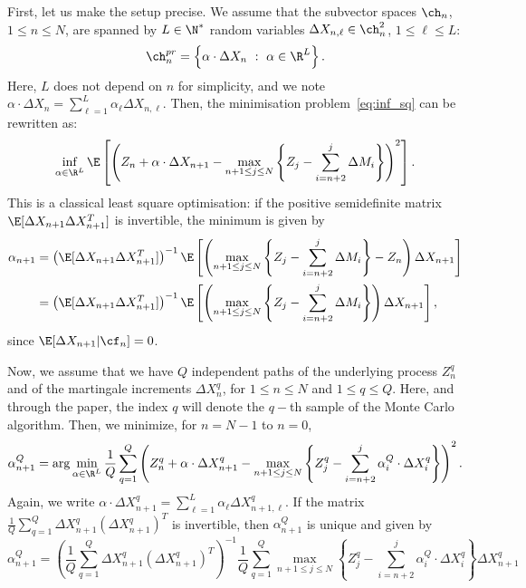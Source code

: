 First, let us make the setup precise. We assume that the subvector spaces $\ch_n$, $1\le n \le N$, are spanned by $L \in \N^*$ random variables $\Delta X_{n,\ell} \in \ch^2_n$, $1\le \ell \le L$:
$$\ch^{pr}_n=\left\{ \alpha \cdot \Delta X_{n} \ : \ \alpha \in \R^L \right\}.$$
Here, $L$ does not depend on $n$ for simplicity, and we note $\alpha \cdot \Delta X_{n}= \sum_{\ell=1}^L \alpha_\ell \Delta X_{n,\ell}$. Then, the minimisation problem~\eqref{eq:inf_sq}  can be rewritten as:
\begin{equation}\label{eq:inf_sq2}
  \inf_{\alpha \in \R^L }\E\left[ \left(Z_{n} + \alpha \cdot \Delta X_{n+1}  - \max_{n + 1\le j \le N} \left\{Z_{j} - \sum_{i=n+2}^{j} \Delta M_i\right\}\right)^2\right].
\end{equation} 
This is a classical least square optimisation: if the positive semidefinite matrix $\E[\Delta X_{n+1}\Delta X_{n+1}^T]$ is invertible, the minimum is given by
\begin{align}
   \alpha_{n+1} &= \left( \E[\Delta X_{n+1}\Delta X_{n+1}^T] \right)^{-1} \E\left[ \left( \max_{n + 1\le j \le N} \left\{Z_{j} - \sum_{i=n+2}^{j} \Delta M_i\right\} -Z_n \right) \Delta X_{n+1}\right] \notag\\
   &= \left( \E[\Delta X_{n+1}\Delta X_{n+1}^T] \right)^{-1} \E\left[ \left( \max_{n + 1\le j \le N} \left\{Z_{j} - \sum_{i=n+2}^{j} \Delta M_i\right\} \right) \Delta X_{n+1}\right], \label{def_alpha_n}
\end{align}
since $\E[\Delta X_{n+1}|\cf_n]=0$. 

Now, we assume that we have $Q$ independent paths of the underlying process $Z_n^q$ and of the martingale increments $\Delta X^q_n$, for $1\le n \le N$ and $1\le q\le Q$. Here, and through the paper, the index $q$ will denote the $q-$th sample of the Monte Carlo algorithm.  Then, we minimize, for $n=N-1$ to $n=0$, 
\begin{equation*}
\alpha^Q_{n+1}= \arg \min_{\alpha \in \R^L} \frac 1Q \sum_{q=1}^Q \left(Z^q_{n} + \alpha \cdot \Delta X^q_{n+1}  - \max_{n + 1\le j \le N} \left\{ Z^q_{j} - \sum_{i=n+2}^{j} \alpha^Q_i \cdot \Delta X^q_i \right\}\right)^2 .
\end{equation*}
Again, we write $\alpha \cdot \Delta X^q_{n+1}=\sum_{\ell=1}^L \alpha_\ell \Delta X^q_{n+1,\ell}$. If the matrix $\frac 1 Q \sum_{q=1}^Q \Delta X^q_{n+1} (\Delta X^q_{n+1})^T$ is invertible, then $\alpha^Q_{n+1}$ is unique and given by
\begin{equation}\label{def_alpha_n_Q}
  \alpha_{n+1}^Q=\left( \frac 1 Q \sum_{q=1}^Q \Delta X^q_{n+1} (\Delta X^q_{n+1})^T \right)^{-1} \frac 1 Q \sum_{q=1}^Q \max_{n + 1\le j \le N} \left\{ Z^q_{j} - \sum_{i=n+2}^{j} \alpha^Q_i \cdot \Delta X^q_i \right\} \Delta X^q_{n+1}
\end{equation}

